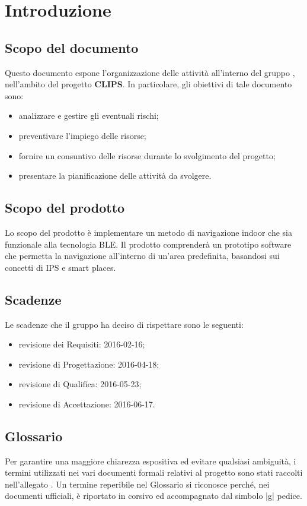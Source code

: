 \documentclass[../PianoProgetto.tex]{subfiles}
\begin{document}
\section{Introduzione}
	\subsection{Scopo del documento}
	Questo documento espone l'organizzazione delle attività all'interno del gruppo \leaf, nell'ambito del progetto \textbf{CLIPS}.
In particolare, gli obiettivi di tale documento sono:
	\begin{itemize}
	\item analizzare e gestire gli eventuali rischi;
	\item preventivare l'impiego delle risorse;
	\item fornire un consuntivo delle risorse durante lo svolgimento del progetto;
	\item presentare la pianificazione delle attività da svolgere.
	\end{itemize}
	
	\subsection{Scopo del prodotto}
	Lo scopo del prodotto è implementare un metodo di navigazione indoor che sia funzionale alla tecnologia BLE.
	Il prodotto comprenderà un prototipo software che permetta la navigazione all’interno di un’area predefinita, basandosi sui concetti di IPS e smart places.

	\subsection{Scadenze}
		Le scadenze che il gruppo \leaf  ha deciso di rispettare sono le seguenti:
		\begin{itemize}
		\item revisione dei Requisiti: 2016-02-16;
		\item revisione di Progettazione: 2016-04-18;
		\item revisione di Qualifica: 2016-05-23;
		\item revisione di Accettazione: 2016-06-17.
		\end{itemize}


	\subsection{Glossario}
		Per garantire una maggiore chiarezza espositiva ed evitare qualsiasi ambiguità, i termini utilizzati nei vari documenti formali relativi al progetto sono stati raccolti nell’allegato \glossariov. 
		Un termine reperibile nel Glossario si riconosce perché, nei documenti ufficiali, è riportato in corsivo ed accompagnato dal simbolo |g| pedice.
\end{document}
